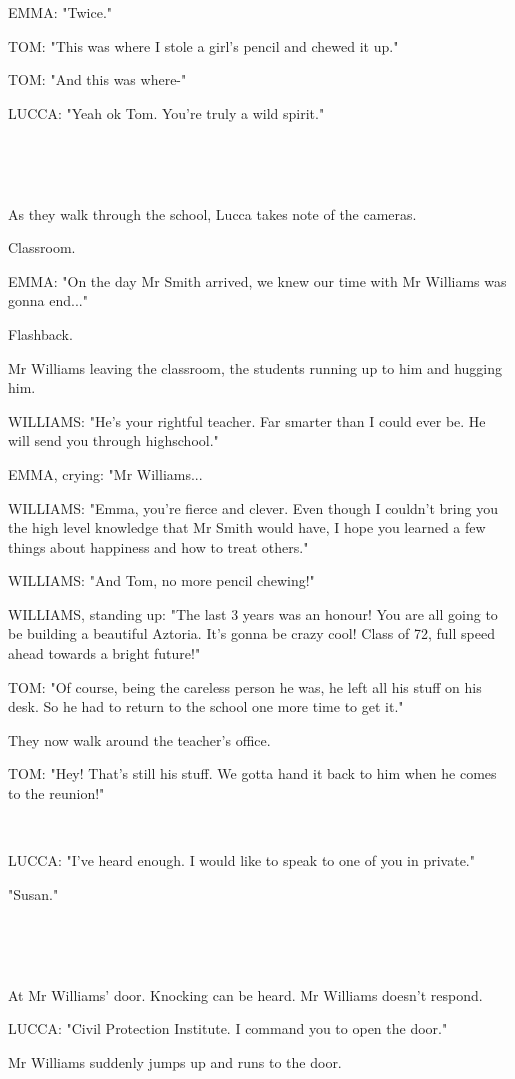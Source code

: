 \documentclass[11pt]{article}
\begin{document}
EMMA: "Twice."

TOM: "This was where I stole a girl's pencil and chewed it up."

TOM: "And this was where-"

LUCCA: "Yeah ok Tom.
You're truly a wild spirit."

\ 

\ 

As they walk through the school, Lucca takes note of the cameras.

Classroom.

EMMA: "On the day Mr Smith arrived, we knew our time with Mr Williams was gonna end..."

Flashback. 

Mr Williams leaving the classroom, the students running up to him and hugging him.

WILLIAMS: "He's your rightful teacher. 
Far smarter than I could ever be.
He will send you through highschool."

EMMA, crying: "Mr Williams...

WILLIAMS: "Emma, you're fierce and clever. 
Even though I couldn't bring you the high level knowledge that Mr Smith would have, I hope you learned a few things about happiness and how to treat others."

WILLIAMS: "And Tom, no more pencil chewing!" 

WILLIAMS, standing up: "The last 3 years was an honour! 
You are all going to be building a beautiful Aztoria.
It's gonna be crazy cool!
Class of 72, full speed ahead towards a bright future!"

TOM: "Of course, being the careless person he was, he left all his stuff on his desk.
So he had to return to the school one more time to get it."

They now walk around the teacher's office.

TOM: "Hey! That's still his stuff.
We gotta hand it back to him when he comes to the reunion!"

\ 

LUCCA: "I've heard enough. I would like to speak to one of you in private."

"Susan."

\ 

\ 

At Mr Williams' door.
Knocking can be heard.
Mr Williams doesn't respond.

LUCCA: "Civil Protection Institute.
I command you to open the door."

Mr Williams suddenly jumps up and runs to the door.
\end{document}
